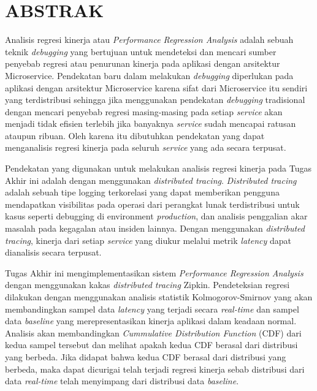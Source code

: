 \clearpage
\chapter*{ABSTRAK}

Analisis regresi kinerja atau \textit{Performance Regression Analysis} adalah sebuah teknik \textit{debugging} yang bertujuan untuk mendeteksi dan mencari sumber penyebab regresi atau penurunan kinerja pada aplikasi dengan arsitektur Microservice. Pendekatan baru dalam melakukan \textit{debugging} diperlukan pada aplikasi dengan arsitektur Microservice karena sifat dari Microservice itu sendiri yang terdistribusi sehingga jika menggunakan pendekatan \textit{debugging} tradisional dengan mencari penyebab regresi masing-masing pada setiap \textit{service} akan menjadi tidak efisien terlebih jika banyaknya \textit{service} sudah mencapai ratusan ataupun ribuan. Oleh karena itu dibutuhkan pendekatan yang dapat menganalisis regresi kinerja pada seluruh \textit{service} yang ada secara terpusat. 

Pendekatan yang digunakan untuk melakukan analisis regresi kinerja pada Tugas Akhir ini adalah dengan menggunakan \textit{distributed tracing}. \textit{Distributed tracing} adalah sebuah tipe logging terkorelasi yang dapat memberikan pengguna mendapatkan visibilitas pada operasi dari perangkat lunak terdistribusi untuk kasus seperti debugging di environment \textit{production}, dan analisis penggalian akar masalah pada kegagalan atau insiden lainnya. Dengan menggunakan \textit{distributed tracing}, kinerja dari setiap \textit{service} yang diukur melalui metrik \textit{latency} dapat dianalisis secara terpusat.

Tugas Akhir ini mengimplementasikan sistem \textit{Performance Regression Analysis} dengan menggunakan kakas \textit{distributed tracing} Zipkin. Pendeteksian regresi dilakukan dengan menggunakan analisis statistik Kolmogorov-Smirnov yang akan membandingkan sampel data \textit{latency} yang terjadi secara \textit{real-time} dan sampel data \textit{baseline} yang merepresentasikan kinerja aplikasi dalam keadaan normal. Analisis akan membandingkan \textit{Cummulative Distribution Function} (CDF) dari kedua sampel tersebut dan melihat apakah kedua CDF berasal dari distribusi yang berbeda. Jika didapat bahwa kedua CDF berasal dari distribusi yang berbeda, maka dapat dicurigai telah terjadi regresi kinerja sebab distribusi dari data \textit{real-time} telah menyimpang dari distribusi data \textit{baseline}.

